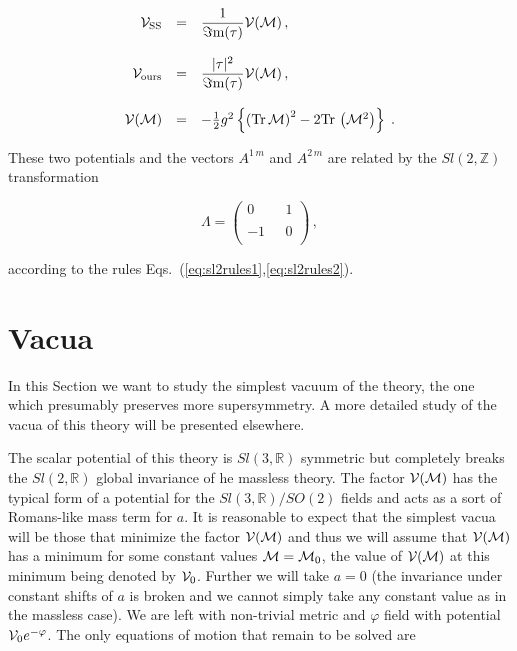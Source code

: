 \documentclass[12pt,a4paper]{article}
\begin{document}
\begin{equation}
  \begin{array}{rcl}
{\cal V}_{\rm SS} & = & 
{\displaystyle\frac{1}{\Im{\rm m}(\tau)}}{\cal V}({\cal M})\, ,\\
& & \\
{\cal V}_{\rm ours} & = & 
{\displaystyle\frac{|\tau|^{2}}{\Im{\rm m}(\tau)}}{\cal V}({\cal M})\, ,\\
& & \\
{\cal V}({\cal M}) & = & 
-{\textstyle\frac{1}{2}}g^{2}
\left\{\left({\rm Tr}\,\mathcal{M}\right)^{2}
-2{\rm Tr}\, \left( \mathcal{M}^{2} \right)
\right\} \; .\\
\end{array}
\end{equation}


These two potentials and the vectors $A^{1\,m}$ and $A^{2\,m}$ are
related by the $Sl(2,\mathbb{Z})$ transformation 

\begin{equation}
 \Lambda =
\left(
  \begin{array}{cc}
0 & \,\,\,\,1\\
& \\
-1 & \,\,\,\,0\\
  \end{array}
\right)\, , 
\end{equation}

\noindent according to the rules 
Eqs.~(\ref{eq:sl2rules1},\ref{eq:sl2rules2}).


\section{Vacua}
\label{sec-vacua}

In this Section we want to study the simplest vacuum of the theory, the
one which presumably preserves more supersymmetry. A more detailed
study of the vacua of this theory will be presented elsewhere.

The scalar potential of this theory is $Sl(3,\mathbb{R})$ symmetric
but completely breaks the $Sl(2,\mathbb{R})$ global invariance of he
massless theory. The factor ${\cal V}({\cal M})$ has the typical form
of a potential for the $Sl(3,\mathbb{R})/SO(2)$ fields and acts as a
sort of Romans-like mass term for $a$. It is reasonable to expect that
the simplest vacua will be those that minimize the factor ${\cal
  V}({\cal M})$ and thus we will assume that ${\cal V}({\cal M})$ has
a minimum for some constant values ${\cal M}={\cal M}_{0}$, the value
of ${\cal V}({\cal M})$ at this minimum being denoted by ${\cal V}_{0}$.
Further we will take $a=0$ (the invariance under constant shifts of
$a$ is broken and we cannot simply take any constant value as in the
massless case).  We are left with non-trivial metric and $\varphi$
field with potential ${\cal V}_{0}e^{-\varphi}$. The only
equations of motion that remain to be solved are
\end{document}
